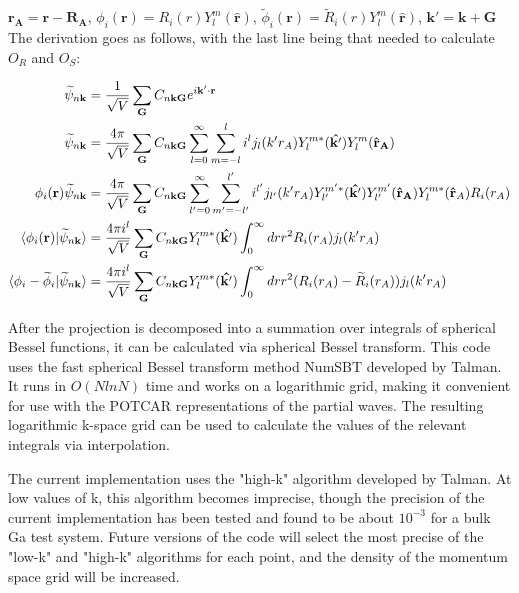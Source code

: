 \documentclass[12pt]{article}
\begin{document}
$\mathbf{r_A} = \mathbf{r} - \mathbf{R_A}$, $\phi_i(\mathbf{r})=R_i(r)Y_l^m(\mathbf{\hat{r}})$,
$\widetilde{\phi}_i(\mathbf{r})=\widetilde{R}_i(r)Y_l^m(\mathbf{\hat{r}})$,
$\mathbf{k'}=\mathbf{k}+\mathbf{G}$\\
The derivation goes as follows, with the last line being that needed to 
calculate $O_R$ and $O_S$:

\begin{equation}
\begin{split}
\widetilde{\psi}_{n\mathbf{k}} & =\frac{1}{\sqrt{V}}\sum_{\mathbf{G}}
C_{n\mathbf{k}\mathbf{G}}e^{i\mathbf{k'}\cdot \mathbf{r}}\\
\widetilde{\psi}_{n\mathbf{k}} & =\frac{4\pi}{\sqrt{V}}\sum_{\mathbf{G}}
C_{n\mathbf{k}\mathbf{G}}\sum_{l=0}^{\infty}\sum_{m=-l}^{l}
i^l j_l(k'r_A)Y_l^{m*}(\mathbf{\hat{k'}})Y_l^m(\mathbf{\hat{r}_A})\\
\phi_i(\mathbf{r})\widetilde{\psi}_{n\mathbf{k}} & =\frac{4\pi}{\sqrt{V}}\sum_{\mathbf{G}}
C_{n\mathbf{k}\mathbf{G}}\sum_{l'=0}^{\infty}\sum_{m'=-l'}^{l'}
i^{l'} j_{l'}(k'r_A)Y_{l'}^{m'*}(\mathbf{\hat{k'}})Y_{l'}^{m'}(\mathbf{\hat{r}_A})
Y_l^{m*}(\mathbf{\hat{r}}_A)R_i(r_A)\\
\braket{\phi_i(\mathbf{r})|\widetilde{\psi}_{n\mathbf{k}}} & =
\frac{4\pi i^l}{\sqrt{V}}\sum_{\mathbf{G}} C_{n\mathbf{k}\mathbf{G}}
Y_l^{m*}(\mathbf{\hat{k'}})\int_0^{\infty}drr^2R_i(r_A)j_l(k'r_A)\\
\braket{\phi_i-\widetilde{\phi}_i|\widetilde{\psi}_{n\mathbf{k}}} & =
\frac{4\pi i^l}{\sqrt{V}}\sum_{\mathbf{G}} C_{n\mathbf{k}\mathbf{G}}
Y_l^{m*}(\mathbf{\hat{k'}})\int_0^{\infty}drr^2(R_i(r_A)-\widetilde{R}_i(r_A))j_l(k'r_A)
\end{split}
\end{equation}

After the projection is decomposed into a summation over integrals of spherical
Bessel functions, it can be calculated via spherical Bessel transform. This code
uses the fast spherical Bessel transform method NumSBT developed by Talman.\cite{TALMAN}
It runs in $O(NlnN)$ time and works on a logarithmic grid, making it convenient for use with
the POTCAR representations of the partial waves. The resulting logarithmic k-space
grid can be used to calculate the values of the relevant integrals via interpolation.

The current implementation uses the "high-k" algorithm developed by Talman. At low
values of k, this algorithm becomes imprecise, though the precision
of the current implementation has been tested and found to be about
$10^{-3}$ for a bulk Ga test system. Future versions of the code
will select the most precise of the "low-k" and "high-k" algorithms for each point,
and the density of the momentum space grid will be increased.
\end{document}
